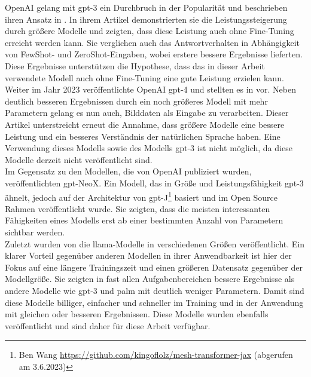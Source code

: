 OpenAI gelang mit \ac{gpt}-3 ein Durchbruch in der Popularität und beschrieben ihren Ansatz in \citet{gpt3}.
In ihrem Artikel demonstrierten sie die Leistungssteigerung durch größere Modelle und zeigten, dass diese Leistung auch ohne Fine-Tuning erreicht werden kann.
Sie verglichen auch das Antwortverhalten in Abhängigkeit von FewShot- und ZeroShot-Eingaben, wobei erstere bessere Ergebnisse lieferten.
Diese Ergebnisse unterstützen die Hypothese, dass das in dieser Arbeit verwendete Modell auch ohne Fine-Tuning eine gute Leistung erzielen kann.\\

Weiter im Jahr 2023 veröffentlichte OpenAI \ac{gpt}-4 und stellten es in \citet{gpt4} vor.
Neben deutlich besseren Ergebnissen durch ein noch größeres Modell mit mehr Parametern gelang es nun auch, Bilddaten als Eingabe zu verarbeiten.
Dieser Artikel unterstreicht erneut die Annahme, dass größere Modelle eine bessere Leistung und ein besseres Verständnis der natürlichen Sprache haben.
Eine Verwendung dieses Modells sowie des Modells \ac{gpt}-3 ist nicht möglich, da diese Modelle derzeit nicht veröffentlicht sind.\\

Im Gegensatz zu den Modellen, die von OpenAI publiziert wurden, veröffentlichten \citet{gpt_neox} \ac{gpt}-NeoX.
Ein Modell, das in Größe und Leistungsfähigkeit \ac{gpt}-3 ähnelt, jedoch auf der Architektur von
\ac{gpt}-J\footnote{Ben Wang \url{https://github.com/kingoflolz/mesh-transformer-jax} (abgerufen am 3.6.2023)} basiert und im Open Source Rahmen veröffentlicht wurde.
Sie zeigten, dass die meisten interessanten Fähigkeiten eines Modells erst ab einer bestimmten Anzahl von Parametern sichtbar werden.\\

Zuletzt wurden von \citet{llama} die \ac{llama}-Modelle in verschiedenen Größen veröffentlicht.
Ein klarer Vorteil gegenüber anderen Modellen in ihrer Anwendbarkeit ist hier der Fokus auf eine längere Trainingszeit und einen größeren Datensatz gegenüber der Modellgröße. 
Sie zeigten in fast allen Aufgabenbereichen bessere Ergebnisse als andere Modelle wie \ac{gpt}-3 und \ac{palm} mit deutlich weniger Parametern.
Damit sind diese Modelle billiger, einfacher und schneller im Training und in der Anwendung mit gleichen oder besseren Ergebnissen.
Diese Modelle wurden ebenfalls veröffentlicht und sind daher für diese Arbeit verfügbar.

